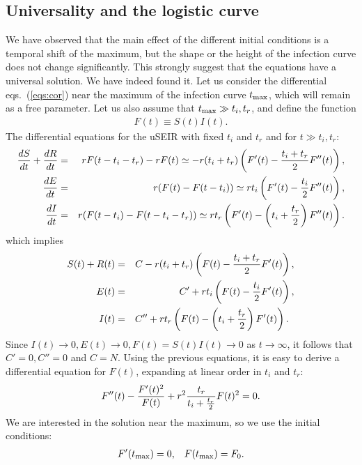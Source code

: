 \documentclass[a4paper,oneside,11pt]{article}
\begin{document}
  \subsection{Universality and the logistic curve}

   We have observed  that the main effect of the different initial conditions is a temporal shift of the maximum, but the shape or the height of the infection curve does not change significantly. This strongly suggest that the equations have a universal solution. We have indeed found it. Let us  consider the differential eqs.~(\ref{eqs:cor}) near the maximum of the infection curve $t_{\rm max}$, which will remain as a free parameter. Let us also assume that $t_{\rm max} \gg t_i, t_r$, and define the function
 \begin{eqnarray}
 F(t) \equiv S(t) I(t).
 \end{eqnarray}
 The differential equations for the uSEIR with fixed $t_i$ and $t_r$ and for $t\gg t_i, t_r$:
 \begin{eqnarray}
 {d S \over dt}+{d R\over dt} &=& r F(t-t_i - t_r) - r F(t) \simeq -r (t_i+t_r) \left(F'(t)-{t_i+t_r\over 2} F''(t)\right), \nonumber\\
  {d E \over dt} &=& r (F(t) - F(t-t_i))  \simeq r t_i \left(F'(t)-{t_i\over 2} F''(t)\right) , \nonumber\\
   {d I \over dt} &=& r (F(t-t_i) - F(t-t_i-t_r))  \simeq r t_r \left(F'(t) - \left(t_i+{t_r\over 2}\right) F''(t)\right).
 \end{eqnarray}
 which implies
 \begin{eqnarray}
 S(t)+R(t) &=& C - r (t_i + t_r) \left(F(t)-{t_i+t_r\over 2} F'(t)\right), \nonumber\\
   E(t) &=& C' +r t_i \left( F(t)-{t_i\over 2} F'(t)\right), \nonumber\\
   I(t) &=& C'' +r t_r \left(F(t)-\left(t_i+{t_r\over 2}\right) F'(t)\right). \;\;
 \end{eqnarray}
 Since $I(t) \rightarrow 0, E(t)\rightarrow 0, F(t) = S(t) I(t) \rightarrow 0$ as $t\rightarrow \infty$, it follows that $C'=0, C''=0$ and $C= N$.
 Using the previous equations, it is easy to derive a differential equation for $F(t)$, expanding at linear order in $t_i$ and $t_r$:
  \begin{eqnarray}
 F''(t) - {F'(t)^2\over F(t)} + r^2 {t_r\over t_i+{t_r\over 2}} F(t)^2 = 0.
 \end{eqnarray}
 We are interested in the solution near the maximum, so we use the initial conditions:
 \begin{eqnarray}
 F'(t_{\rm max}) = 0, \;\;\; F(t_{\rm max}) = F_0.
 \end{eqnarray}
\end{document}
